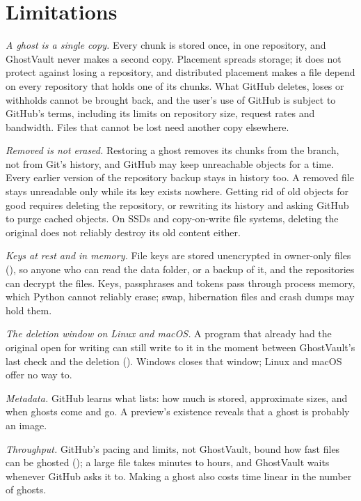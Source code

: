 \section{Limitations}\label{sec:limitations}

\emph{A ghost is a single copy.} Every chunk is stored once, in one repository, and GhostVault never
makes a second copy. Placement spreads storage; it does not protect against losing a repository, and
distributed placement makes a file depend on every repository that holds one of its chunks. What
GitHub deletes, loses or withholds cannot be brought back, and the user's use of GitHub is subject to
GitHub's terms, including its limits on repository size, request rates and bandwidth. Files that
cannot be lost need another copy elsewhere.

\emph{Removed is not erased.} Restoring a ghost removes its chunks from the branch, not from Git's
history, and GitHub may keep unreachable objects for a time. Every earlier version of the repository
backup stays in history too. A removed file stays unreadable only while its key exists nowhere. Getting
rid of old objects for good requires deleting the repository, or rewriting its history and asking
GitHub to purge cached objects. On SSDs and copy-on-write file systems, deleting the original does not
reliably destroy its old content either.

\emph{Keys at rest and in memory.} File keys are stored unencrypted in owner-only files
(), so anyone who can read the data folder, or a backup of it, and the repositories
can decrypt the files. Keys, passphrases and tokens pass through process memory, which Python cannot
reliably erase; swap, hibernation files and crash dumps may hold them.

\emph{The deletion window on Linux and macOS.} A program that already had the original open for
writing can still write to it in the moment between GhostVault's last check and the deletion
(). Windows closes that window; Linux and macOS offer no way to.

\emph{Metadata.} GitHub learns what  lists: how much is stored, approximate sizes,
and when ghosts come and go. A preview's existence reveals that a ghost is probably an image.

\emph{Throughput.} GitHub's pacing and limits, not GhostVault, bound how fast files can be ghosted
(); a large file takes minutes to hours, and GhostVault waits whenever GitHub
asks it to. Making a ghost also costs time linear in the number of ghosts.

